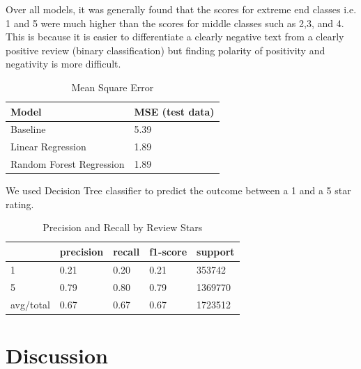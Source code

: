 \documentclass[12pt]{article}
\begin{document}
Over all models, it was generally found that the scores for extreme end classes i.e. 1 and 5 
were much higher than the scores for middle classes such as 2,3, and 4. This is because it is 
easier to differentiate a clearly negative text from a clearly positive review (binary classification)
but finding polarity of positivity and negativity is more difficult.

\begin{table}[h]
  \caption{Mean Square Error}
  \centering
  \begin{tabular}{|l|l|}
    \hline
    \textbf{Model}    & \textbf{MSE (test data)} \\
    \hline
    Baseline          & 5.39 \\
    \hline
    Linear Regression & 1.89 \\
    \hline
    Random Forest Regression & 1.89 \\
    \hline
  \end{tabular}
  \end{table}
  
  We used Decision Tree classifier to predict the outcome between a 1 and a 5 star rating.
  
  \begin{table}[h]
	\caption{Precision and Recall by Review Stars}
	\centering
	\begin{tabular}{|l|l|l|l|l|}
	\hline
    \textbf{} & \textbf{precision} & \textbf{recall} & \textbf{f1-score} & \textbf{support} \\
	\hline 
	1         & 0.21      & 0.20   & 0.21     & 353742  \\
	\hline 
	5         & 0.79      & 0.80   & 0.79     & 1369770 \\
 	\hline 
 	avg/total & 0.67      & 0.67   & 0.67     & 1723512 \\
 	\hline
\end{tabular}
\end{table}


\section{Discussion}
\end{document}
